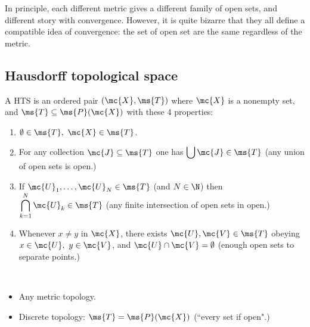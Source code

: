 In principle, each different metric gives a different family of open sets, and different story with convergence. However, it is quite bizarre that they all define a compatible idea of convergence: the set of open set are the same regardless of the metric.

\subsection{Hausdorff topological space}
\begin{ndef}{}
	A HTS is an ordered pair \((\mc{X},\ms{T})\) where \(\mc{X}\) is a nonempty set, and \(\ms{T}\subseteq\ms{P}(\mc{X})\) with these 4 properties:
	\begin{enumerate}[(HTS 1)]
		\item \(\emptyset\in\ms{T},~\mc{X}\in\ms{T}\).
		
		\item For any collection \(\mc{J}\subseteq\ms{T}\) one has \(\displaystyle\bigcup\mc{J}\in\ms{T}\) (any union of open sets is open.)
		
		\item If \(\mc{U}_1,\dots,\mc{U}_N\in\ms{T}\) (and \(N\in\N\)) then \(\displaystyle\bigcap_{k=1}^N\mc{U}_k\in\ms{T}\) (any finite intersection of open sets in open.)
		
		\item Whenever \(x\neq y\) in \(\mc{X}\), there exists \(\mc{U},\mc{V}\in\ms{T}\) obeying \(x\in\mc{U},~y\in\mc{V}\), and \(\mc{U}\cap \mc{V}=\emptyset\) (enough open sets to separate points.)
	\end{enumerate}
\end{ndef}

\begin{example}~
	\begin{itemize}
		\item Any metric topology.
		
		\item Discrete topology: \(\ms{T}=\ms{P}(\mc{X})\) (``every set if open".)
	\end{itemize}
\end{example}